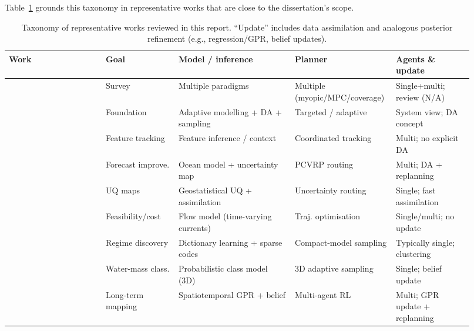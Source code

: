 \vspace{1mm}
\noindent Table~\ref{tab:taxonomy_papers} grounds this taxonomy in representative works that are close to the dissertation’s scope.

\begin{table}[H]
  \centering
  \caption{Taxonomy of representative works reviewed in this report. ``Update'' includes data assimilation and analogous posterior refinement (e.g., regression/GPR, belief updates).}
  \label{tab:taxonomy_papers}
  \scriptsize
  \renewcommand{\arraystretch}{1.1}
  \setlength{\tabcolsep}{4pt}
  \begin{tabular}{p{0.20\linewidth} p{0.15\linewidth} p{0.24\linewidth} p{0.17\linewidth} p{0.16\linewidth}}
    \hline
    \textbf{Work} & \textbf{Goal} & \textbf{Model / inference} & \textbf{Planner} & \textbf{Agents \& update} \\
    \hline
    \textcite{hwang2019auvreview} &
    Survey &
    Multiple paradigms &
    Multiple (myopic/MPC/coverage) &
    Single+multi; review (N/A) \\

    \textcite{lermusiaux2007adaptive} &
    Foundation &
    Adaptive modelling + DA + sampling &
    Targeted / adaptive &
    System view; DA concept \\

    \textcite{das2012coordinated} &
    Feature tracking &
    Feature inference / context &
    Coordinated tracking &
    Multi; no explicit DA \\

    \textcite{bernacchi2025closingloop} &
    Forecast improve. &
    Ocean model + uncertainty map &
    PCVRP routing &
    Multi; DA + replanning \\

    \textcite{duarte2025geostatistical} &
    UQ maps &
    Geostatistical UQ + assimilation &
    Uncertainty routing &
    Single; fast assimilation \\

    \textcite{aguiar2018trajectoryopt} &
    Feasibility/cost &
    Flow model (time-varying currents) &
    Traj. optimisation &
    Single/multi; no update \\

    \textcite{fossum2020compact} &
    Regime discovery &
    Dictionary learning + sparse codes &
    Compact-model sampling &
    Typically single; clustering \\

    \textcite{ge2023watermasses} &
    Water-mass class. &
    Probabilistic class model (3D) &
    3D adaptive sampling &
    Single; belief update \\

    \textcite{dalfabbro2025douroplume} &
    Long-term mapping &
    Spatiotemporal GPR + belief &
    Multi-agent RL &
    Multi; GPR update + replanning \\
    \hline
  \end{tabular}
\end{table}


